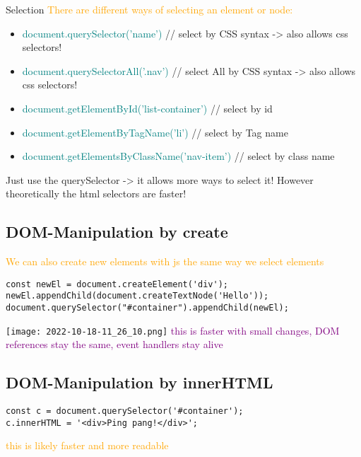 \documentclass[main.tex,fontsize=6pt,paper=a4,paper=landscape,DIV=calc,]{scrartcl}
\begin{document}
\begin{multicols*}{4}
Selection 
\textcolor{orange}{There are different ways of selecting an element or node:}
\begin{itemize}
  \item \textcolor{teal}{document.querySelector('name')} // select by CSS syntax -> also allows css selectors!
  \item \textcolor{teal}{document.querySelectorAll('.nav')} // select All by CSS syntax -> also allows css selectors!
  \item \textcolor{teal}{document.getElementById('list-container')} // select by id
  \item \textcolor{teal}{document.getElementByTagName('li')} // select by Tag name
  \item \textcolor{teal}{document.getElementsByClassName('nav-item')} // select by class name
\end{itemize}
Just use the querySelector -> it allows more ways to select it! \newline
However theoretically the html selectors are faster!

\subsection{DOM-Manipulation by create}  
\textcolor{orange}{We can also create new elements with js the same way we select elements}
\vspace{-2mm}
\begin{lstlisting}
const newEl = document.createElement('div');
newEl.appendChild(document.createTextNode('Hello'));
document.querySelector("#container").appendChild(newEl);
\end{lstlisting}
\vspace{2mm}
\texttt{[image: 2022-10-18-11\_26\_10.png]}\newline 
\textcolor{purple}{this is faster with small changes, DOM references stay the same, event handlers stay alive}

\subsection{DOM-Manipulation by innerHTML}  
\vspace{-2mm}
\begin{lstlisting}
const c = document.querySelector('#container');
c.innerHTML = '<div>Ping pang!</div>';
\end{lstlisting}
\vspace{2mm}
\textcolor{orange}{this is likely faster and more readable}
 

\end{multicols*}
\end{document}
